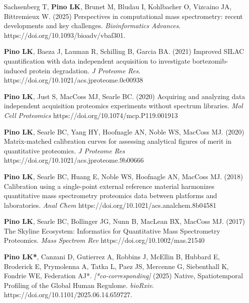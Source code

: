 \documentclass[11pt]{article}
\begin{document}
\begin{etaremune}

    \item Sachsenberg T, \textbf{Pino LK}, Brunet M, Bludau I, Kohlbacher O, Vizcaino JA, Bittremieux W. (2025) Perspectives in computational mass spectrometry: recent developments and key challenges. \textit{Bioinformatics Advances}. https://doi.org/10.1093/bioadv/vbaf301.

    \item \textbf{Pino LK}, Baeza J, Lauman R, Schilling B, Garcia BA. (2021) Improved 
    SILAC quantification with data independent acquisition to investigate 
    bortezomib-induced protein degradation. \textit{J Proteome Res}. 
    https://doi.org/10.1021/acs.jproteome.0c00938
    
    \item \textbf{Pino LK}, Just S, MacCoss MJ, Searle BC. (2020) Acquiring and analyzing 
    data independent acquisition proteomics experiments without spectrum libraries. 
    \textit{Mol Cell Proteomics} https://doi.org/10.1074/mcp.P119.001913
    
    \item \textbf{Pino LK}, Searle BC, Yang HY, Hoofnagle AN, Noble WS, MacCoss MJ. 
    (2020) Matrix-matched calibration curves for assessing analytical figures of merit 
    in quantitative proteomics. \textit{J Proteome Res} 
    https://doi.org/10.1021/acs.jproteome.9b00666
    
    \item \textbf{Pino LK}, Searle BC, Huang E, Noble WS, Hoofnagle AN, MacCoss MJ. 
    (2018) Calibration using a single-point external reference material harmonizes 
    quantitative mass spectrometry proteomics data between platforms and laboratories. 
    \textit{Anal Chem} https://doi.org/10.1021/acs.analchem.8b04581
    
    \item \textbf{Pino LK}, Searle BC, Bollinger JG, Nunn B, MacLean BX, MacCoss MJ. 
    (2017) The Skyline Ecosystem: Informatics for Quantitative Mass Spectrometry 
    Proteomics. \textit{Mass Spectrom Rev} https://doi.org/10.1002/mas.21540

    
\end{etaremune}

\begin{etaremune}

    \item \textbf{Pino LK*}, Canzani D, Gutierrez A, Robbins J, McEllin B, Hubbard E, Broderick E, Prymolenna A, Tatka L, Paez JS, Mercenne G, Siebenthall K, Fondrie WE, Federation AJ*. \textit{[*co-corresponding]} (2025) Native, Spatiotemporal Profiling of the Global Human Regulome. \textit{bioRxiv}. https://doi.org/10.1101/2025.06.14.659727.

\end{etaremune}
\end{document}
